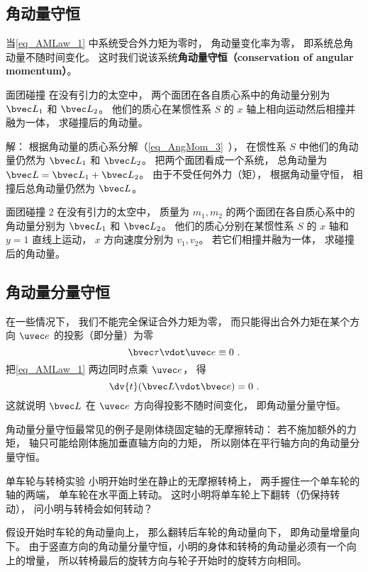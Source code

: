 \subsection{角动量守恒}
当\autoref{eq_AMLaw_1} 中系统受合外力矩为零时， 角动量变化率为零， 即系统总角动量不随时间变化。 这时我们说该系统\textbf{角动量守恒（conservation of angular momentum）}。

\begin{example}{面团碰撞}
在没有引力的太空中， 两个面团在各自质心系中的角动量分别为 $\bvec L_1$ 和 $\bvec L_2$。 他们的质心在某惯性系 $S$ 的 $x$ 轴上相向运动然后相撞并融为一体， 求碰撞后的角动量。

解： 根据角动量的质心系分解（\autoref{eq_AngMom_3}~）， 在惯性系 $S$ 中他们的角动量仍然为 $\bvec L_1$ 和 $\bvec L_2$。 把两个面团看成一个系统， 总角动量为 $\bvec L = \bvec L_1 + \bvec L_2$。 由于不受任何外力（矩）， 根据角动量守恒， 相撞后总角动量仍然为 $\bvec L$。
\end{example}

\begin{exercise}{面团碰撞 2}
在没有引力的太空中， 质量为 $m_1, m_2$ 的两个面团在各自质心系中的角动量分别为 $\bvec L_1$ 和 $\bvec L_2$。 他们的质心分别在某惯性系 $S$ 的 $x$ 轴和 $y = 1$ 直线上运动， $x$ 方向速度分别为 $v_1, v_2$。 若它们相撞并融为一体， 求碰撞后的角动量。
\end{exercise}

\subsection{角动量分量守恒}
在一些情况下， 我们不能完全保证合外力矩为零， 而只能得出合外力矩在某个方向 $\uvec e$ 的投影（即分量）为零
\begin{equation}
\bvec \tau \vdot \uvec e \equiv 0~.
\end{equation}
把\autoref{eq_AMLaw_1} 两边同时点乘 $\uvec e$， 得
\begin{equation}
\dv{t} (\bvec L \vdot \bvec e) = 0~.
\end{equation}
这就说明 $\bvec L$ 在 $\uvec e$ 方向得投影不随时间变化， 即角动量分量守恒。

角动量分量守恒最常见的例子是刚体绕固定轴的无摩擦转动： 若不施加额外的力矩， 轴只可能给刚体施加垂直轴方向的力矩， 所以刚体在平行轴方向的角动量分量守恒。

\begin{example}{单车轮与转椅实验}
小明开始时坐在静止的无摩擦转椅上， 两手握住一个单车轮的轴的两端， 单车轮在水平面上转动。 这时小明将单车轮上下翻转（仍保持转动）， 问小明与转椅会如何转动？

假设开始时车轮的角动量向上， 那么翻转后车轮的角动量向下， 即角动量增量向下。 由于竖直方向的角动量分量守恒，小明的身体和转椅的角动量必须有一个向上的增量， 所以转椅最后的旋转方向与轮子开始时的旋转方向相同。
\end{example}

